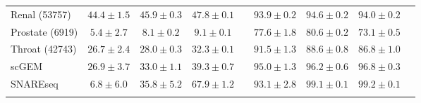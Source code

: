 \begin{table}
\begin{footnotesize}
\begin{tabular}{@{\hskip 0.1in}l@{\hskip 0.1in}c@{\hskip 0.1in}c@{\hskip 0.1in}c@{\hskip 0.1in}c@{\hskip 0.1in}c@{\hskip 0.1in}c@{\hskip 0.1in}c@{\hskip 0.1in}c@{\hskip 0.1in}}
Renal \tiny{(53757)} & $44.4\pm1.5$ & $45.9\pm0.3$ & $\mathbf{47.8\pm0.1}$ && $93.9\pm0.2$ & $\mathbf{94.6\pm0.2}$ & $94.0\pm0.2$ \\ 
Prostate \tiny{(6919)} & $5.4\pm2.7$ & $8.1\pm0.2$ & $\mathbf{9.1\pm0.1}$ && $77.6\pm1.8$ & $\mathbf{80.6\pm0.2}$ & $73.1\pm0.5$ \\ 
Throat \tiny{(42743)} & $26.7\pm2.4$ & $28.0\pm0.3$ & $\mathbf{32.3\pm0.1}$ && $\mathbf{91.5\pm1.3}$ & $88.6\pm0.8$ & $86.8\pm1.0$ \\ \midrule[0.2pt]
scGEM & $26.9\pm3.7$ & $33.0\pm1.1$ & $\mathbf{39.3\pm0.7}$ && $95.0\pm1.3$ & $96.2\pm0.6$ & $\mathbf{96.8\pm0.3}$ \\
SNAREseq & $6.8\pm6.0$ & $35.8\pm5.2$ & $\mathbf{67.9\pm1.2}$ && $93.1\pm2.8$ & $99.1\pm0.1$ & $\mathbf{99.2\pm0.1}$ \\
\bottomrule[1.5pt]
\label{tab:DR_genomics_data}
\end{tabular}
\end{footnotesize}
\vspace*{-0.5cm}
\end{table}




